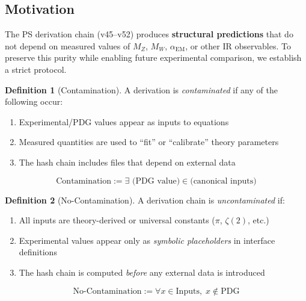 \documentclass[11pt,a4paper]{article}
\theoremstyle{definition}
\newtheorem{definition}{Definition}[section]
\begin{document}
\subsection{Motivation}
\label{subsec:motivation}

The PS derivation chain (v45--v52) produces \textbf{structural predictions} that do not depend
on measured values of $M_Z$, $M_W$, $\alpha_{\text{EM}}$, or other IR observables. To preserve
this purity while enabling future experimental comparison, we establish a strict protocol.

\begin{definition}[Contamination]
\label{def:contamination}
A derivation is \emph{contaminated} if any of the following occur:
\begin{enumerate}
\item Experimental/PDG values appear as inputs to equations
\item Measured quantities are used to ``fit'' or ``calibrate'' theory parameters
\item The hash chain includes files that depend on external data
\end{enumerate}
\end{definition}

\begin{equation}
\label{eq:contamination_def}
\text{Contamination} := \exists \text{ (PDG value)} \in \text{(canonical inputs)}
\end{equation}

\begin{definition}[No-Contamination]
\label{def:no_contamination}
A derivation chain is \emph{uncontaminated} if:
\begin{enumerate}
\item All inputs are theory-derived or universal constants ($\pi$, $\zeta(2)$, etc.)
\item Experimental values appear only as \emph{symbolic placeholders} in interface definitions
\item The hash chain is computed \emph{before} any external data is introduced
\end{enumerate}
\end{definition}

\begin{equation}
\label{eq:no_contamination}
\text{No-Contamination} := \forall x \in \text{Inputs}, \; x \notin \text{PDG}
\end{equation}
\end{document}
